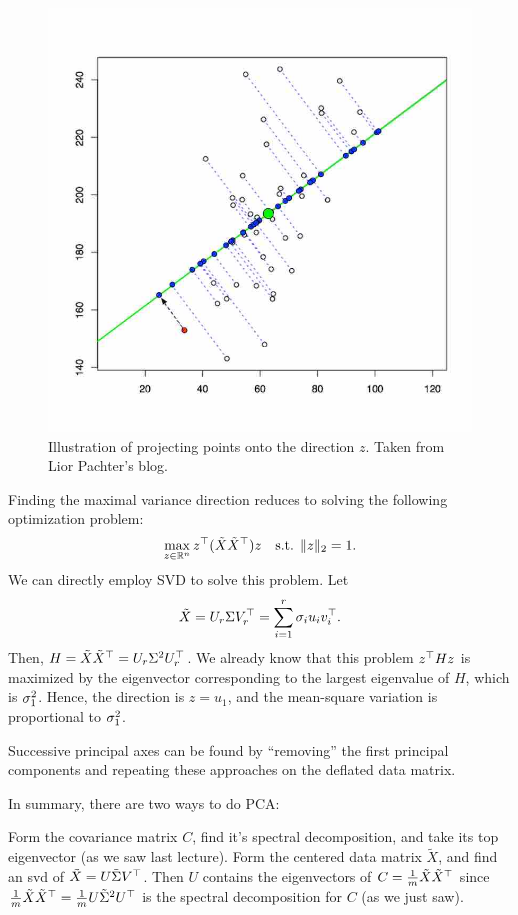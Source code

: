 \documentclass[11 pt]{scrartcl}
\begin{document}
\begin{figure}[!htb]
    \centering
    \includegraphics[scale = 0.3]{pca.jpg}
    \caption{Illustration of projecting points onto the direction $z$. Taken from Lior Pachter's blog.}
\end{figure}

Finding the maximal variance direction reduces to solving the following optimization problem: 
\[ \max_{z\in \mathbb R^n} z^\top (\tilde{X} \tilde{X}^\top) z \quad \text{s.t. } \|z\|_2 = 1.\] 
We can directly employ SVD to solve this problem. 
Let 
\[ \tilde{X} = U_r \Sigma V_r^\top = \sum_{i=1}^r \sigma_i u_i v_i^\top.\] 
Then, $H = \tilde{X}\tilde{X}^\top = U_r\Sigma^2 U_r^\top$. 
We already know that this problem $z^\top H z$ is maximized by the eigenvector corresponding to the largest eigenvalue of $H$, which is $\sigma_1^2$.
Hence, the direction is $z = u_1$, and the mean-square variation is proportional to $\sigma_1^2$. 

Successive principal axes can be found by ``removing'' the first principal components and repeating these approaches on the deflated data matrix. 

In summary, there are two ways to do PCA: 
\begin{enumerate}
    \ii Form the covariance matrix $C$, find it's spectral decomposition, and take its top eigenvector (as we saw last lecture). 
    \ii Form the centered data matrix $\tilde{X}$, and find an svd of $\tilde{X} = U\tilde{\Sigma} V^\top$.
    Then $U$ contains the eigenvectors of $C = \frac 1m \tilde{X}\tilde{X}^\top$ since $\frac 1m \tilde{X}\tilde{X}^\top = \frac 1m U\tilde{\Sigma}^2 U^\top$ is the spectral decomposition for $C$ (as we just saw).
\end{enumerate}
\end{document}
